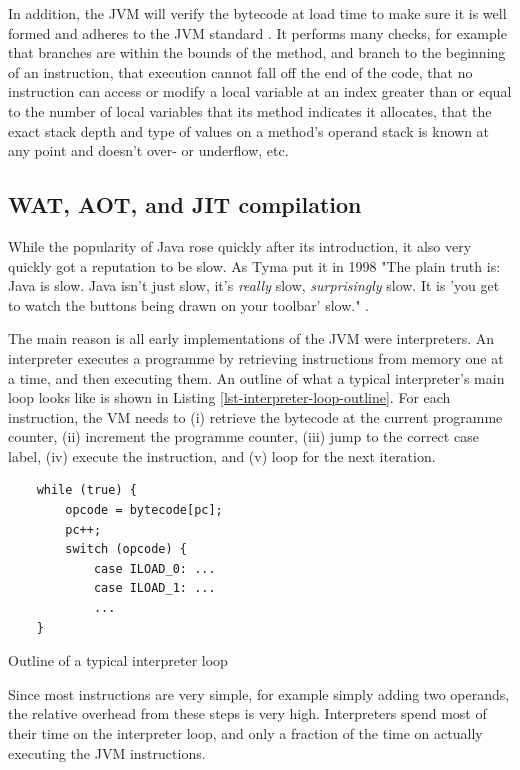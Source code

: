 In addition, the JVM will verify the bytecode at load time to make sure it is well formed and adheres to the JVM standard \cite{Lindholm:2017vu}. It performs many checks, for example that branches are within the bounds of the method, and branch to the beginning of an instruction, that execution cannot fall off the end of the code, that no instruction can access or modify a local variable at an index greater than or equal to the number of local variables that its method indicates it allocates, that the exact stack depth and type of values on a method's operand stack is known at any point and doesn't over- or underflow, etc.

\subsection{WAT, AOT, and JIT compilation}
While the popularity of Java rose quickly after its introduction, it also very quickly got a reputation to be slow. As Tyma put it in 1998 "The plain truth is: Java is slow. Java isn't just slow, it's \emph{really} slow, \emph{surprisingly} slow. It is 'you get to watch the buttons being drawn on your toolbar' slow." \cite{Tyma:1998vj}.

The main reason is all early implementations of the JVM were interpreters. An interpreter executes a programme by retrieving instructions from memory one at a time, and then executing them. An outline of what a typical interpreter's main loop looks like is shown in Listing \ref{lst-interpreter-loop-outline}. For each instruction, the VM needs to (i) retrieve the bytecode at the current programme counter, (ii) increment the programme counter, (iii) jump to the correct case label, (iv) execute the instruction, and (v) loop for the next iteration.

\begin{listing}
    \centering
    \begin{verbatim}
    while (true) {
        opcode = bytecode[pc];
        pc++;
        switch (opcode) {
            case ILOAD_0: ...
            case ILOAD_1: ...
            ...
    }
    \end{verbatim}
\caption{Outline of a typical interpreter loop}
\label{lst-interpreter-loop-outline}
\end{listing}

Since most instructions are very simple, for example simply adding two operands, the relative overhead from these steps is very high. Interpreters spend most of their time on the interpreter loop, and only a fraction of the time on actually executing the JVM instructions.

